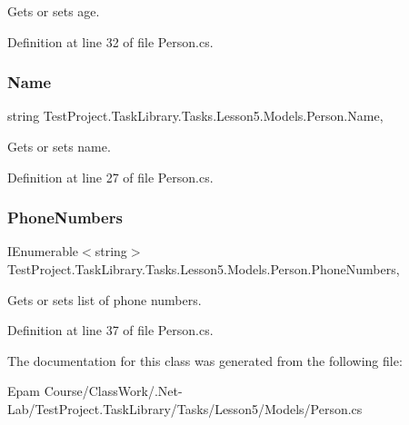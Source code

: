 Gets or sets age. 



Definition at line 32 of file Person.\+cs.

\mbox{\label{class_test_project_1_1_task_library_1_1_tasks_1_1_lesson5_1_1_models_1_1_person_a494f314f579b9a1770e99f3727efa130}} 
\subsubsection{\texorpdfstring{Name}{Name}}
{\footnotesize\ttfamily string Test\+Project.\+Task\+Library.\+Tasks.\+Lesson5.\+Models.\+Person.\+Name\hspace{0.3cm}{\ttfamily [get]}, {\ttfamily [set]}}



Gets or sets name. 



Definition at line 27 of file Person.\+cs.

\mbox{\label{class_test_project_1_1_task_library_1_1_tasks_1_1_lesson5_1_1_models_1_1_person_a1bf1e43f9d3ef092c30580bf657f3ab6}} 
\subsubsection{\texorpdfstring{PhoneNumbers}{PhoneNumbers}}
{\footnotesize\ttfamily I\+Enumerable$<$string$>$ Test\+Project.\+Task\+Library.\+Tasks.\+Lesson5.\+Models.\+Person.\+Phone\+Numbers\hspace{0.3cm}{\ttfamily [get]}, {\ttfamily [set]}}



Gets or sets list of phone numbers. 



Definition at line 37 of file Person.\+cs.



The documentation for this class was generated from the following file\+:\begin{DoxyCompactItemize}
\item 
Epam Course/\+Class\+Work/.\+Net-\/\+Lab/\+Test\+Project.\+Task\+Library/\+Tasks/\+Lesson5/\+Models/Person.\+cs\end{DoxyCompactItemize}
